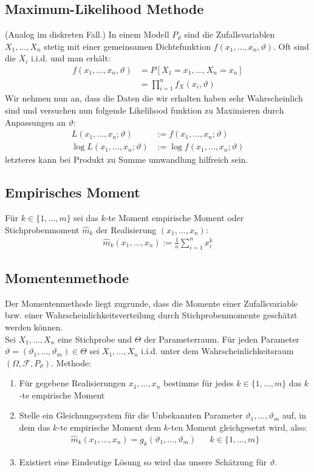 \documentclass[8pt]{extarticle}
\newcommand{\F}{\mathcal{F}}
\newcommand{\vt}{\vartheta}
\newcommand{\Sn}{\sum_{i = 1}^n}
\newcommand{\zufallsvariablen}{X_1, \dots, X_n}
\begin{document}
\begin{multicols*}{3}
  \subsection*{Maximum-Likelihood Methode}
  (Analog im diskreten Fall.) In einem Modell $P_\vt$ sind die Zufallsvariablen
  $\zufallsvariablen$ stetig mit einer gemeinsamen Dichtefunktion
  $f(x_1, \dots, x_n, \vt)$. Oft sind die $X_i$ i.i.d. und man erhält:
  \begin{align*}
    f(x_1, \dots, x_n, \vt) & = P[X_1 = x_1, \dots, X_n = x_n] \\
                            & = \prod_{i = 1}^n f_X(x_i, \vt)
  \end{align*}
  Wir nehmen nun an, dass die Daten die wir erhalten haben sehr
  Wahrscheinlich sind und versuchen nun folgende Likelihood funktion
  zu Maximieren durch Anpassungen an $\vt$:
  \begin{align*}
    L(x_1, \dots, x_n; \vt)      & := f(x_1, \dots, x_n; \vt)      \\
    \log L(x_1, \dots, x_n; \vt) & := \log f(x_1, \dots, x_n; \vt)
  \end{align*}
  letzteres kann bei Produkt zu Summe umwandlung hilfreich sein.
  \subsection*{Empirisches Moment}
  Für $k \in \{1, \dots, m\}$ sei das $k$-te Moment empirische Moment
  oder Stichprobenmoment $\hat{m}_k$ der Realisierung $(x_1, \dots, x_n)$:
  \begin{align*}
    \hat{m}_k(x_1, \dots, x_n) := \frac{1}{n} \Sn x_i^k
  \end{align*}
  \subsection*{Momentenmethode}
  Der Momentenmethode liegt zugrunde, dass die Momente einer Zufallsvariable
  bzw. einer Wahrscheinlichkeitsverteilung durch Stichprobenmomente geschätzt
  werden können.\\
  Sei $\zufallsvariablen$ eine Stichprobe und $\varTheta$ der Parameterraum. Für
  jeden Parameter $\vt = (\vt_1, \dots, \vt_m) \in \varTheta$ sei
  $\zufallsvariablen$ i.i.d. unter dem Wahrscheinlichkeitsraum $(\Omega, \F, P_\vt)$.
  Methode:
  \begin{enumerate}
    \item Für gegebene Realisierungen $x_1, \dots, x_n$ bestimme für jedes
          $k \in \{1, \dots, m\}$ das $k$-te empirische Moment
    \item Stelle ein Gleichungssystem für die Unbekannten Parameter
          $\vt_1, \dots, \vt_m$ auf, in dem das $k$-te empirische Moment dem
          $k$-ten Moment gleichgesetzt wird, also:
          \begin{align*}
            \hat{m}_k(x_1, \dots, x_n) = g_k(\vt_1, \dots, \vt_m)
             &  & k \in \{1, \dots, m\}
          \end{align*}
    \item Existiert eine Eindeutige Lösung so wird das unsere Schätzung für $\vt$.
  \end{enumerate}

\end{multicols*}
\end{document}
